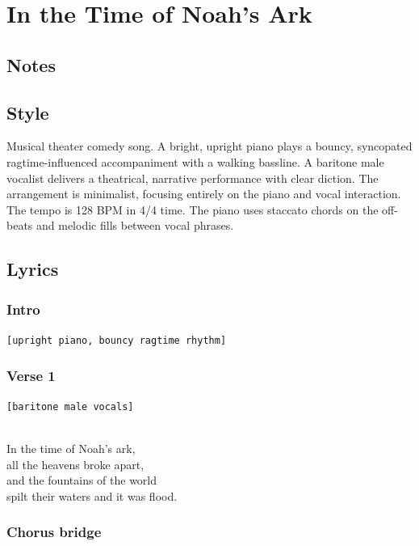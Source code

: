 \section{In the Time of Noah's Ark}\label{in-the-time-of-noahs-ark-1}

\subsection{Notes}\label{notes-9}

\subsection{Style}\label{style-8}

Musical theater comedy song. A bright, upright piano plays a bouncy,
syncopated ragtime-influenced accompaniment with a walking bassline. A
baritone male vocalist delivers a theatrical, narrative performance with
clear diction. The arrangement is minimalist, focusing entirely on the
piano and vocal interaction. The tempo is 128 BPM in 4/4 time. The piano
uses staccato chords on the off-beats and melodic fills between vocal
phrases.

\subsection{Lyrics}\label{lyrics-8}

\subsubsection{Intro}\label{intro}

\texttt{{[}upright\ piano,\ bouncy\ ragtime\ rhythm{]}}

\subsubsection{Verse 1}\label{verse-1-2}

\texttt{{[}baritone\ male\ vocals{]}}\strut \\
In the time of Noah's ark,\\
all the heavens broke apart,\\
and the fountains of the world\\
spilt their waters and it was flood.

\subsubsection{Chorus bridge}\label{chorus-bridge}

